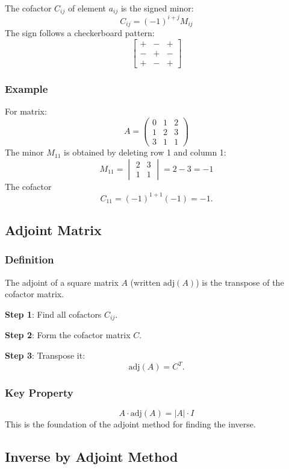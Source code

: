 \documentclass[
]{article}
\begin{document}
The cofactor \(C_{ij}\) of element \(a_{ij}\) is the signed minor:
\[
C_{ij} = (-1)^{i+j} M_{ij}
\]
The sign follows a checkerboard pattern:
\[
\begin{bmatrix}
+ & - & + \\
- & + & - \\
+ & - & +
\end{bmatrix}
\]
\subsubsection{Example}\label{example-5}

For matrix:
\[
A =
\begin{pmatrix}
0 & 1 & 2 \\
1 & 2 & 3 \\
3 & 1 & 1
\end{pmatrix}
\]
The minor \(M_{11}\) is obtained by deleting row 1 and column 1:
\[
M_{11} =
\begin{vmatrix}
2 & 3 \\
1 & 1
\end{vmatrix} = 2 - 3 = -1
\]
The cofactor
\[
C_{11} = (-1)^{1+1}(-1) = -1.
\]

\subsection{Adjoint Matrix}\label{adjoint-matrix}

\subsubsection{Definition}\label{definition-13}

The adjoint of a square matrix \(A\) (written \(\text{adj}(A)\)) is the
transpose of the cofactor matrix.

\textbf{Step 1}: Find all cofactors \(C_{ij}\).

\textbf{Step 2}: Form the cofactor matrix \(C\).

\textbf{Step 3}: Transpose it:
\[
\text{adj}(A) = C^T.
\]
\subsubsection{Key Property}\label{key-property}
\[
A \cdot \text{adj}(A) = |A| \cdot I
\]
This is the foundation of the adjoint method for finding the inverse.

\subsection{Inverse by Adjoint Method}\label{inverse-by-adjoint-method}
\end{document}
